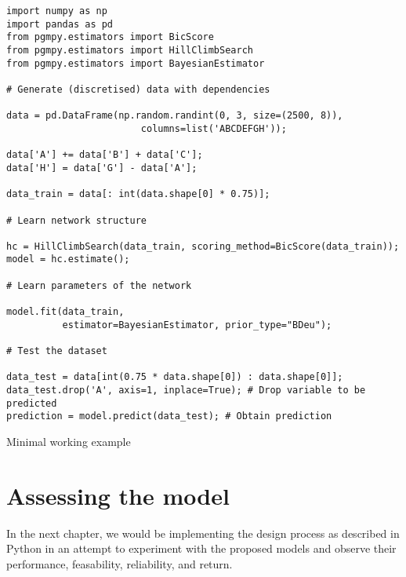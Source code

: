 \begin{listing}[ht]
\begin{verbatim}
import numpy as np
import pandas as pd
from pgmpy.estimators import BicScore
from pgmpy.estimators import HillClimbSearch
from pgmpy.estimators import BayesianEstimator

# Generate (discretised) data with dependencies

data = pd.DataFrame(np.random.randint(0, 3, size=(2500, 8)),
                        columns=list('ABCDEFGH'));

data['A'] += data['B'] + data['C'];
data['H'] = data['G'] - data['A'];

data_train = data[: int(data.shape[0] * 0.75)];

# Learn network structure

hc = HillClimbSearch(data_train, scoring_method=BicScore(data_train));
model = hc.estimate();

# Learn parameters of the network

model.fit(data_train,
          estimator=BayesianEstimator, prior_type="BDeu");

# Test the dataset

data_test = data[int(0.75 * data.shape[0]) : data.shape[0]]; 
data_test.drop('A', axis=1, inplace=True); # Drop variable to be predicted
prediction = model.predict(data_test); # Obtain prediction
\end{verbatim}
\caption{Minimal working example}
\label{listing:1}
\end{listing}

\section{Assessing the model}



In the next chapter, we would be implementing the design process as described in Python in an attempt to experiment with the proposed models and observe their performance, feasability, reliability, and return. 






